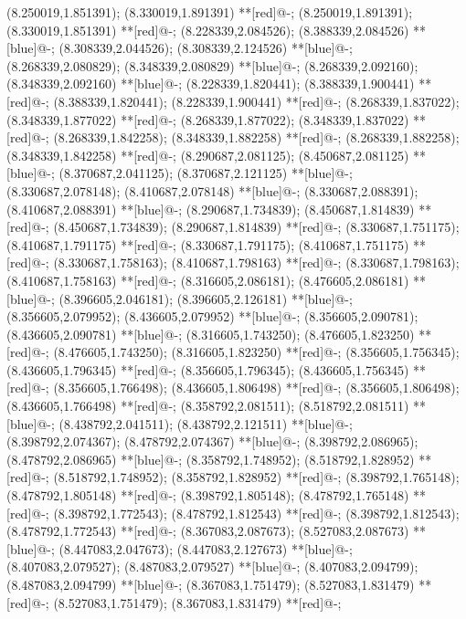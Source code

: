 (8.250019,1.851391); (8.330019,1.891391) **[red]@{-};
(8.250019,1.891391); (8.330019,1.851391) **[red]@{-};
(8.228339,2.084526); (8.388339,2.084526) **[blue]@{-};
(8.308339,2.044526); (8.308339,2.124526) **[blue]@{-};
(8.268339,2.080829); (8.348339,2.080829) **[blue]@{-};
(8.268339,2.092160); (8.348339,2.092160) **[blue]@{-};
(8.228339,1.820441); (8.388339,1.900441) **[red]@{-};
(8.388339,1.820441); (8.228339,1.900441) **[red]@{-};
(8.268339,1.837022); (8.348339,1.877022) **[red]@{-};
(8.268339,1.877022); (8.348339,1.837022) **[red]@{-};
(8.268339,1.842258); (8.348339,1.882258) **[red]@{-};
(8.268339,1.882258); (8.348339,1.842258) **[red]@{-};
(8.290687,2.081125); (8.450687,2.081125) **[blue]@{-};
(8.370687,2.041125); (8.370687,2.121125) **[blue]@{-};
(8.330687,2.078148); (8.410687,2.078148) **[blue]@{-};
(8.330687,2.088391); (8.410687,2.088391) **[blue]@{-};
(8.290687,1.734839); (8.450687,1.814839) **[red]@{-};
(8.450687,1.734839); (8.290687,1.814839) **[red]@{-};
(8.330687,1.751175); (8.410687,1.791175) **[red]@{-};
(8.330687,1.791175); (8.410687,1.751175) **[red]@{-};
(8.330687,1.758163); (8.410687,1.798163) **[red]@{-};
(8.330687,1.798163); (8.410687,1.758163) **[red]@{-};
(8.316605,2.086181); (8.476605,2.086181) **[blue]@{-};
(8.396605,2.046181); (8.396605,2.126181) **[blue]@{-};
(8.356605,2.079952); (8.436605,2.079952) **[blue]@{-};
(8.356605,2.090781); (8.436605,2.090781) **[blue]@{-};
(8.316605,1.743250); (8.476605,1.823250) **[red]@{-};
(8.476605,1.743250); (8.316605,1.823250) **[red]@{-};
(8.356605,1.756345); (8.436605,1.796345) **[red]@{-};
(8.356605,1.796345); (8.436605,1.756345) **[red]@{-};
(8.356605,1.766498); (8.436605,1.806498) **[red]@{-};
(8.356605,1.806498); (8.436605,1.766498) **[red]@{-};
(8.358792,2.081511); (8.518792,2.081511) **[blue]@{-};
(8.438792,2.041511); (8.438792,2.121511) **[blue]@{-};
(8.398792,2.074367); (8.478792,2.074367) **[blue]@{-};
(8.398792,2.086965); (8.478792,2.086965) **[blue]@{-};
(8.358792,1.748952); (8.518792,1.828952) **[red]@{-};
(8.518792,1.748952); (8.358792,1.828952) **[red]@{-};
(8.398792,1.765148); (8.478792,1.805148) **[red]@{-};
(8.398792,1.805148); (8.478792,1.765148) **[red]@{-};
(8.398792,1.772543); (8.478792,1.812543) **[red]@{-};
(8.398792,1.812543); (8.478792,1.772543) **[red]@{-};
(8.367083,2.087673); (8.527083,2.087673) **[blue]@{-};
(8.447083,2.047673); (8.447083,2.127673) **[blue]@{-};
(8.407083,2.079527); (8.487083,2.079527) **[blue]@{-};
(8.407083,2.094799); (8.487083,2.094799) **[blue]@{-};
(8.367083,1.751479); (8.527083,1.831479) **[red]@{-};
(8.527083,1.751479); (8.367083,1.831479) **[red]@{-};
